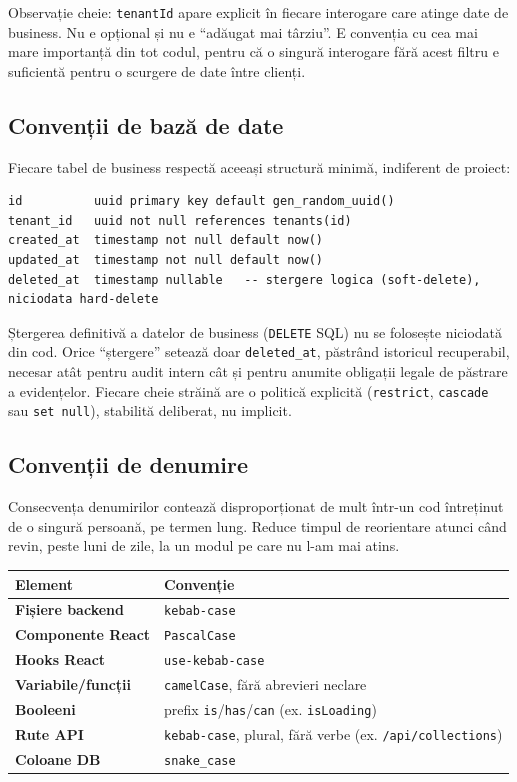 \documentclass[11pt, a4paper]{article}
\begin{document}
\vspace{0.5em}
\noindent Observație cheie: \texttt{tenantId} apare explicit în fiecare interogare care atinge
date de business. Nu e opțional și nu e ``adăugat mai târziu''. E convenția cu cea mai mare
importanță din tot codul, pentru că o singură interogare fără acest filtru e suficientă pentru
o scurgere de date între clienți.

\subsection{Convenții de bază de date}

Fiecare tabel de business respectă aceeași structură minimă, indiferent de proiect:

\begingroup\small
\begin{verbatim}
id          uuid primary key default gen_random_uuid()
tenant_id   uuid not null references tenants(id)
created_at  timestamp not null default now()
updated_at  timestamp not null default now()
deleted_at  timestamp nullable   -- stergere logica (soft-delete), niciodata hard-delete
\end{verbatim}
\endgroup

\vspace{0.3em}
\noindent Ștergerea definitivă a datelor de business (\texttt{DELETE} SQL) nu se folosește
niciodată din cod. Orice ``ștergere'' setează doar \texttt{deleted\_at}, păstrând istoricul
recuperabil, necesar atât pentru audit intern cât și pentru anumite obligații legale de
păstrare a evidențelor. Fiecare cheie străină are o politică explicită (\texttt{restrict},
\texttt{cascade} sau \texttt{set null}), stabilită deliberat, nu implicit.

\subsection{Convenții de denumire}

Consecvența denumirilor contează disproporționat de mult într-un cod întreținut de o singură
persoană, pe termen lung. Reduce timpul de reorientare atunci când revin, peste luni de zile,
la un modul pe care nu l-am mai atins.

\renewcommand{\arraystretch}{1.25}
\begin{tabularx}{\textwidth}{>{\bfseries}l X}
\toprule
Element & Convenție \\
\midrule
Fișiere backend & \texttt{kebab-case} \\
Componente React & \texttt{PascalCase} \\
Hooks React & \texttt{use-kebab-case} \\
Variabile/funcții & \texttt{camelCase}, fără abrevieri neclare \\
Booleeni & prefix \texttt{is}/\texttt{has}/\texttt{can} (ex. \texttt{isLoading}) \\
Rute API & \texttt{kebab-case}, plural, fără verbe (ex. \texttt{/api/collections}) \\
Coloane DB & \texttt{snake\_case} \\
\bottomrule
\end{tabularx}
\end{document}
